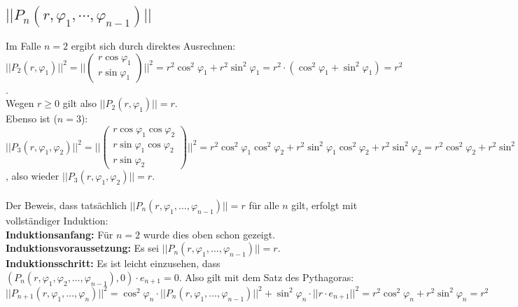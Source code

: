 \documentclass[a4paper,11pt]{scrartcl}
\begin{document}
\subsection{$||P_n(r,\varphi_1,\cdots,\varphi_{n-1})||$}
Im Falle $n=2$ ergibt sich durch direktes Ausrechnen:\\
$||P_2(r,\varphi_1)||^2=||\begin{pmatrix}r\cos\varphi_1\\ r\sin\varphi_1\end{pmatrix}||^2=
r^2\cos^2\varphi_1+r^2\sin^2\varphi_1=r^2\cdot(\cos^2\varphi_1+\sin^2\varphi_1)=r^2$.\\
Wegen $r\geq 0$ gilt also $||P_2(r,\varphi_1)||=r$.\\
Ebenso ist ($n=3$): $||P_3(r,\varphi_1,\varphi_2)||^2=
||\begin{pmatrix}r\cos\varphi_1\cos\varphi_2\\ r\sin\varphi_1\cos\varphi_2\\ r\sin\varphi_2\end{pmatrix}||^2=
r^2\cos^2\varphi_1\cos^2\varphi_2+r^2\sin^2\varphi_1\cos^2\varphi_2+r^2\sin^2\varphi_2
=r^2\cos^2\varphi_2+r^2\sin^2\varphi_2=r^2$, also wieder $||P_3(r,\varphi_1,\varphi_2)||=r$.\\ \\
Der Beweis, dass tatsächlich $||P_n(r,\varphi_1,\ldots,\varphi_{n-1})||=r$ für alle $n$ gilt, erfolgt mit vollständiger Induktion:\\
\textbf{Induktionsanfang:} Für $n=2$ wurde dies oben schon gezeigt. \checkmark\\
\textbf{Induktionsvoraussetzung:} Es sei $||P_n(r,\varphi_1,\ldots,\varphi_{n-1})||=r$.\\
\textbf{Induktionsschritt:} Es ist leicht einzusehen, dass $(P_n(r,\varphi_1, \varphi_2, \ldots, \varphi_{n-1}), 0)\cdot e_{n+1} = 0$. 
Also gilt mit dem Satz des Pythagoras:\\
$||P_{n+1}(r,\varphi_1,\ldots,\varphi_n)||^2=\cos^2\varphi_n\cdot||P_n(r,\varphi_1,\ldots,\varphi_{n-1})||^2 +\sin^2\varphi_n\cdot||r\cdot e_{n+1}||^2=r^2\cos^2\varphi_n+r^2\sin^2\varphi_n=r^2$ \checkmark
\end{document}
